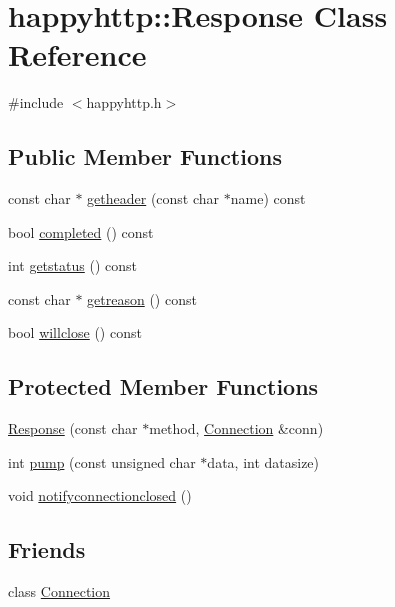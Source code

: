 \hypertarget{classhappyhttp_1_1_response}{}\section{happyhttp\+:\+:Response Class Reference}
\label{classhappyhttp_1_1_response}


{\ttfamily \#include $<$happyhttp.\+h$>$}

\subsection*{Public Member Functions}
\begin{DoxyCompactItemize}
\item 
const char $\ast$ \hyperlink{classhappyhttp_1_1_response_a85d88da6b088e62d4fd48e5661e2813a}{getheader} (const char $\ast$name) const 
\item 
bool \hyperlink{classhappyhttp_1_1_response_a264d98ebc0faa6d2fa90ad39045d4e9c}{completed} () const 
\item 
int \hyperlink{classhappyhttp_1_1_response_abc705241686edcaa3beae49c7fe21dea}{getstatus} () const 
\item 
const char $\ast$ \hyperlink{classhappyhttp_1_1_response_a487fe77efd931d404f0da3f39e42827a}{getreason} () const 
\item 
bool \hyperlink{classhappyhttp_1_1_response_a9bfb1fbce588f7b64333e6d995c2177e}{willclose} () const 
\end{DoxyCompactItemize}
\subsection*{Protected Member Functions}
\begin{DoxyCompactItemize}
\item 
\hyperlink{classhappyhttp_1_1_response_ad8db8db6628ad5a6a3ab978e5a668ae5}{Response} (const char $\ast$method, \hyperlink{classhappyhttp_1_1_connection}{Connection} \&conn)
\item 
int \hyperlink{classhappyhttp_1_1_response_a7f16643cb8cc14de614e7dd031e177a1}{pump} (const unsigned char $\ast$data, int datasize)
\item 
void \hyperlink{classhappyhttp_1_1_response_ab43d317331c9729e5d42bd920ad71a68}{notifyconnectionclosed} ()
\end{DoxyCompactItemize}
\subsection*{Friends}
\begin{DoxyCompactItemize}
\item 
class \hyperlink{classhappyhttp_1_1_response_a54a11fdc71e1679a42fa0c0e3856673d}{Connection}
\end{DoxyCompactItemize}


